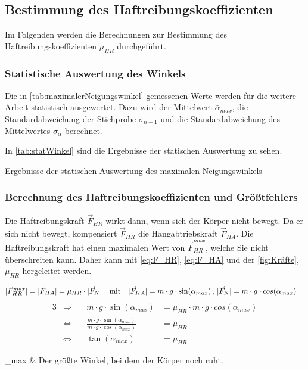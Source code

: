 \subsection{Bestimmung des Haftreibungskoeffizienten}

Im Folgenden werden die Berechnungen zur Bestimmung des Haftreibungskoeffizienten $\mu_{HR}$ durchgeführt.

\subsubsection{Statistische Auswertung des Winkels}

Die in \autoref{tab:maximalerNeigungswinkel} gemessenen Werte werden für die weitere Arbeit statistisch ausgewertet. Dazu wird der Mittelwert $\bar{\alpha}_{max}$, die Standardabweichung der Stichprobe $\sigma_{n-1}$ und die Standardabweichung des Mittelwertes $\sigma_{\alpha}$ berechnet.

In \autoref{tab:statWinkel} sind die Ergebnisse der statischen Auswertung zu sehen.

\begin{table}[h]
    \center 
    \caption[Statistische Auswertung des maximalen Neigungswinkels]{Ergebnisse der statischen Auswertung des maximalen Neigungswinkels}
    
    \label{tab:statWinkel}
\end{table}

\subsubsection{Berechnung des Haftreibungskoeffizienten und Größtfehlers}

Die Haftreibungskraft $\vec{F}_{HR}$ wirkt dann, wenn sich der Körper nicht bewegt. Da er sich nicht bewegt, kompensiert $\vec{F}_{HR}$ die Hangabtriebskraft $\vec{F}_{HA}$. Die Haftreibungskraft hat einen maximalen Wert von $\vec{F}_{HR}^{max}$, welche Sie nicht überschreiten kann. Daher kann mit \autoref{eq:F_HR}, \autoref{eq:F_HA} und der \autoref{fig:Kräfte}, $\mu_{HR}$ hergeleitet werden.

\begin{align*}
  \lvert\vec{F}_{HR}^{max}\rvert = \lvert\vec{F}_{HA}\rvert &= \mu_{HR} \cdot \lvert\vec{F}_{N}\rvert \quad \text{mit} & \lvert\vec{F}_{HA}\rvert = m \cdot g \cdot \sin(\alpha_{max}) \, , \, \lvert\vec{F}_{N}\rvert &= m \cdot g \cdot cos(\alpha_{max})
\end{align*}
\vspace{-1cm}
\begin{alignat}{3}
  &\Rightarrow &\quad m \cdot g \cdot \sin(\alpha_{max}) &= \mu_{HR} \cdot m \cdot g \cdot cos(\alpha_{max}) \nonumber \\
  &\Leftrightarrow &\quad \frac{m \cdot g \cdot \sin(\alpha_{max})}{m \cdot g \cdot \cos(\alpha_{max})} &= \mu_{HR}\nonumber \\ 
  &\Leftrightarrow &\quad \tan(\alpha_{max}) &= \mu_{HR} \label{eq:muHR}
\end{alignat}
\begin{conditions}
  \alpha_{max} & Der größte Winkel, bei dem der Körper noch ruht.
\end{conditions}

